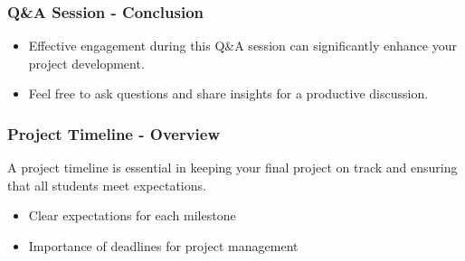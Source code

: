 \documentclass[aspectratio=169]{beamer}
\begin{document}
\begin{frame}[fragile]
    \frametitle{Q\&A Session - Conclusion}
    \begin{itemize}
        \item Effective engagement during this Q\&A session can significantly enhance your project development.
        \item Feel free to ask questions and share insights for a productive discussion.
    \end{itemize}
\end{frame}

\begin{frame}[fragile]
    \frametitle{Project Timeline - Overview}
    A project timeline is essential in keeping your final project on track and ensuring that all students meet expectations. 
    \begin{itemize}
        \item Clear expectations for each milestone
        \item Importance of deadlines for project management
    \end{itemize}
\end{frame}
\end{document}
